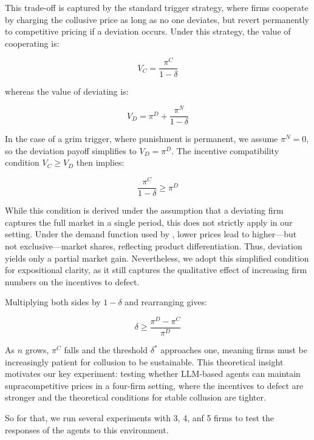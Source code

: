 This trade-off is captured by the standard trigger strategy, where firms cooperate by charging the collusive price as long as no one deviates, but revert permanently to competitive pricing if a deviation occurs. Under this strategy, the value of cooperating is:

$$V_C = \frac{\pi^C}{1 - \delta}$$

whereas the value of deviating is:

$$V_D = \pi^D + \frac{\pi^N}{1 - \delta}$$

In the case of a grim trigger, where punishment is permanent, we assume $\pi^N = 0$, so the deviation payoff simplifies to $V_D = \pi^D$. The incentive compatibility condition $V_C \geq V_D$ then implies:

$$\frac{\pi^C}{1 - \delta} \geq \pi^D$$

While this condition is derived under the assumption that a deviating firm captures the full market in a single period, this does not strictly apply in our setting. Under the demand function used by \textcite{calvano_artificial_2020}, lower prices lead to higher—but not exclusive—market shares, reflecting product differentiation. Thus, deviation yields only a partial market gain. Nevertheless, we adopt this simplified condition for expositional clarity, as it still captures the qualitative effect of increasing firm numbers on the incentives to defect.

Multiplying both sides by $1 - \delta$ and rearranging gives:

$$\delta \geq \frac{\pi^D - \pi^C}{\pi^D}$$

As $n$ grows, $\pi^C$ falls and the threshold $\delta^*$ approaches one, meaning firms must be increasingly patient for collusion to be sustainable. This theoretical insight motivates our key experiment: testing whether LLM-based agents can maintain supracompetitive prices in a four-firm setting, where the incentives to defect are stronger and the theoretical conditions for stable collusion are tighter.


So for that, we run several experiments with 3, 4, anf 5 firms to test the responses of the agents to this environment.





